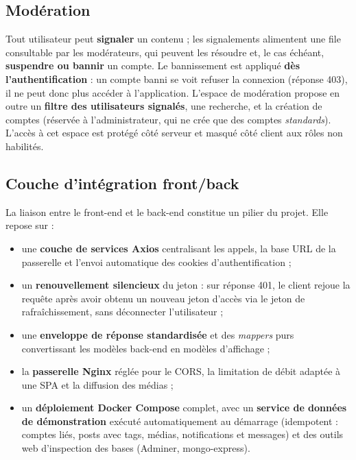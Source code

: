 \subsection{Modération}

Tout utilisateur peut \textbf{signaler} un contenu ; les signalements alimentent
une file consultable par les modérateurs, qui peuvent les résoudre et, le cas
échéant, \textbf{suspendre ou bannir} un compte. Le bannissement est appliqué
\textbf{dès l'authentification} : un compte banni se voit refuser la connexion
(réponse 403), il ne peut donc plus accéder à l'application. L'espace de modération
propose en outre un \textbf{filtre des utilisateurs signalés}, une recherche, et la
création de comptes (réservée à l'administrateur, qui ne crée que des comptes
\emph{standards}). L'accès à cet espace est protégé côté serveur et masqué côté
client aux rôles non habilités.

\newpage

\subsection{Couche d'intégration front/back}

La liaison entre le front-end et le back-end constitue un pilier du projet. Elle
repose sur :

\begin{itemize}[leftmargin=1.4em]
  \item une \textbf{couche de services Axios} centralisant les appels, la base URL
        de la passerelle et l'envoi automatique des cookies d'authentification ;
  \item un \textbf{renouvellement silencieux} du jeton : sur réponse 401, le client
        rejoue la requête après avoir obtenu un nouveau jeton d'accès via le jeton
        de rafraîchissement, sans déconnecter l'utilisateur ;
  \item une \textbf{enveloppe de réponse standardisée} et des \textit{mappers}
        purs convertissant les modèles back-end en modèles d'affichage ;
  \item la \textbf{passerelle Nginx} réglée pour le CORS, la limitation de débit
        adaptée à une SPA et la diffusion des médias ;
  \item un \textbf{déploiement Docker Compose} complet, avec un \textbf{service de
        données de démonstration} exécuté automatiquement au démarrage (idempotent :
        comptes liés, posts avec tags, médias, notifications et messages) et des
        outils web d'inspection des bases (Adminer, mongo-express).
\end{itemize}


